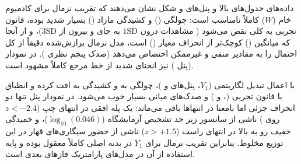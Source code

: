 \documentclass[12pt]{exam}
\begin{document}
\begin{table}[htbp]
\centering
\caption{مقایسه پنج صدک تجربی کلیدی با صدک‌های نظری توزیع نرمال $N(\hat{\mu}, \hat{\sigma}^2)$ برای $W$ و $Y_1$}
\end{table}

داده‌های جدول‌های بالا و پنل‌های  و  شکل  نشان می‌دهند که تقریب نرمال برای کادمیوم خام ($W$) کاملاً نامناسب است: چولگی () و کشیدگی مازاد () بسیار شدید بوده، قانون تجربی به کلی نقض می‌شود ( مشاهدات درون $1\text{SD}$ به جای  و  بیرون از $3\text{SD}$)، و از آنجا که میانگین () کوچک‌تر از انحراف معیار () است، مدل نرمال برازش‌شده دقیقاً  از کل احتمال را به مقادیر منفی و غیرممکن اختصاص می‌دهد (صدک پنجم نظری ). در نمودار  (پنل ) نیز انحنای شدید از خط مرجع کاملاً مشهود است.

با اعمال تبدیل لگاریتمی ($Y_1$، پنل‌های  و )، چولگی به  و کشیدگی به  افت کرده و انطباق با قانون تجربی (،  و ) و صدک‌های میانی بسیار خوب می‌شود. در نمودار  پنل  تنها دو انحراف جزئی اما بامعنا در انتهاها باقی می‌ماند: یک پله افقی در انتهای چپ ($z < -2.4$ روی ) ناشی از سانسور زیر حد تشخیص آزمایشگاه ($\log_{10}(0.046)$)، و خمیدگی خفیف رو به بالا در انتهای راست ($z > +1.5$) ناشی از حضور سیگاری‌های قهار در این توزیع مخلوط. بنابراین تقریب نرمال برای $Y_1$ در بدنه اصلی کاملاً معقول بوده و پایه استفاده از آن در مدل‌های پارامتریک فازهای بعدی است.
\end{document}
